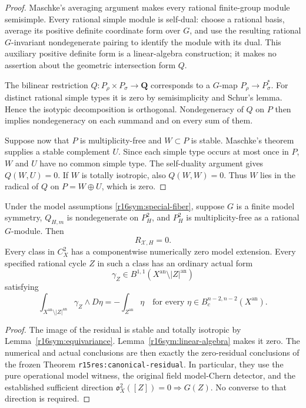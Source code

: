 \begin{proof}
Maschke's averaging argument makes every rational finite-group
module semisimple.  Every rational simple module is self-dual:
choose a rational basis, average its positive definite
coordinate form over $G$, and use the resulting rational
$G$-invariant nondegenerate pairing to identify the module
with its dual.  This auxiliary positive definite form is a
linear-algebra construction; it makes no assertion about
the geometric intersection form $Q$.

The bilinear restriction $Q:P_\rho\times P_\sigma\to
\mathbf Q$ corresponds to a $G$-map
$P_\rho\to P_\sigma^*$.  For distinct rational simple
types it is zero by semisimplicity and Schur's lemma.  Hence
the isotypic decomposition is orthogonal.  Nondegeneracy of
$Q$ on $P$ then implies nondegeneracy on each summand and on
every sum of them.

Suppose now that $P$ is multiplicity-free and $W\subset P$
is stable.  Maschke's theorem supplies a stable complement
$U$.  Since each simple type occurs at most once in $P$,
$W$ and $U$ have no common simple type.  The self-duality
argument gives $Q(W,U)=0$.  If $W$ is totally isotropic,
also $Q(W,W)=0$.  Thus $W$ lies in the radical of $Q$ on
$P=W\oplus U$, which is zero.
\end{proof}

\begin{theorem}
\label{r16sym:vanishing}
Under the model assumptions \eqref{r16sym:special-fiber},
suppose $G$ is a finite model symmetry, $Q_{H,m}$ is
nondegenerate on $P_H^2$, and $P_H^2$ is multiplicity-free
as a rational $G$-module.  Then
\[
                       R_{\mathcal X,H}=0.
\tag{ER16.6}\label{r16sym:zero}
\]
Every class in $C_X^2$ has a componentwise numerically zero
model extension.  Every specified rational cycle $Z$ in
such a class has an ordinary actual form
\[
             \gamma_Z\in B^{1,1}
                    (X^{\mathrm{an}}\setminus|Z|^{\mathrm{an}})
\]
satisfying
\[
 \int_{X^{\mathrm{an}}\setminus|Z|^{\mathrm{an}}}
                         \gamma_Z\wedge D\eta
                  =-\int_{Z^{\mathrm{an}}}\eta
                 \quad\text{for every }
                 \eta\in B_c^{n-2,n-2}(X^{\mathrm{an}}).
\tag{ER16.7}\label{r16sym:strong-G}
\]
\end{theorem}

\begin{proof}
The image of the residual is stable and totally isotropic
by Lemma~\ref{r16sym:equivariance}.  Lemma~\ref{r16sym:linear-algebra}
makes it zero.  The numerical and actual conclusions are
then exactly the zero-residual conclusions of the frozen
Theorem \texttt{r15res:canonical-residual}.  In particular,
they use the pure operational model witness, the original
field model-Chern detector, and the established sufficient
direction $\mathfrak o_X^2([Z])=0\Rightarrow G(Z)$.
No converse to that direction is required.
\end{proof}

